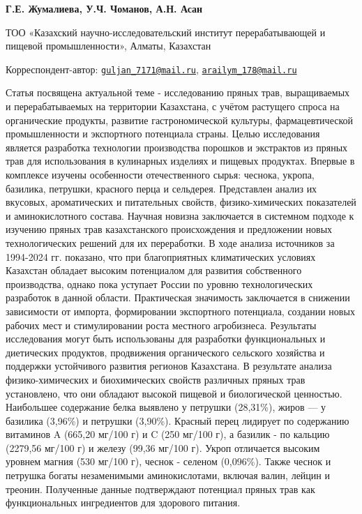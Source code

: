 
\begin{articleheader}

{\bfseries
Г.Е. Жумалиева\textsuperscript{\envelope },
У.Ч. Чоманов,
А.Н. Асан\textsuperscript{\envelope }
}
\end{articleheader}

\begin{affiliation}
ТОО «Казахский научно-исследовательский институт перерабатывающей и
пищевой промышленности», Алматы, Казахстан

\raggedright \textsuperscript{\envelope }Корреспондент-автор:
\href{mailto:guljan\_7171@mail.ru}{\nolinkurl{guljan\_7171@mail.ru}},
\href{mailto:arailym\_178@mail.ru}{\nolinkurl{arailym\_178@mail.ru}}
\end{affiliation}

Статья посвящена актуальной теме - исследованию пряных трав,
выращиваемых и перерабатываемых на территории Казахстана, с учётом
растущего спроса на органические продукты, развитие гастрономической
культуры, фармацевтической промышленности и экспортного потенциала
страны. Целью исследования является разработка технологии производства
порошков и экстрактов из пряных трав для использования в кулинарных
изделиях и пищевых продуктах. Впервые в комплексе изучены особенности
отечественного сырья: чеснока, укропа, базилика, петрушки, красного
перца и сельдерея. Представлен анализ их вкусовых, ароматических и
питательных свойств, физико-химических показателей и аминокислотного
состава. Научная новизна заключается в системном подходе к изучению
пряных трав казахстанского происхождения и предложении новых
технологических решений для их переработки. В ходе анализа источников за
1994-2024 гг. показано, что при благоприятных климатических условиях
Казахстан обладает высоким потенциалом для развития собственного
производства, однако пока уступает России по уровню технологических
разработок в данной области. Практическая значимость заключается в
снижении зависимости от импорта, формировании экспортного потенциала,
создании новых рабочих мест и стимулировании роста местного агробизнеса.
Результаты исследования могут быть использованы для разработки
функциональных и диетических продуктов, продвижения органического
сельского хозяйства и поддержки устойчивого развития регионов
Казахстана. В результате анализа физико-химических и биохимических
свойств различных пряных трав установлено, что они обладают высокой
пищевой и биологической ценностью. Наибольшее содержание белка выявлено
у петрушки (28,31\%), жиров --- у базилика (3,96\%) и петрушки (3,90\%).
Красный перец лидирует по содержанию витаминов A (665,20 мг/100 г) и C
(250 мг/100 г), а базилик - по кальцию (2279,56 мг/100 г) и железу
(99,36 мг/100 г). Укроп отличается высоким уровнем магния (530 мг/100
г), чеснок - селеном (0,096\%). Также чеснок и петрушка богаты
незаменимыми аминокислотами, включая валин, лейцин и треонин. Полученные
данные подтверждают потенциал пряных трав как функциональных
ингредиентов для здорового питания.

